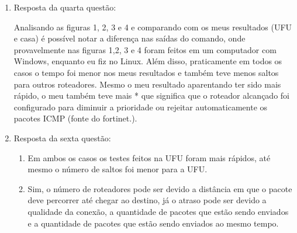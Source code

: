 \documentclass[12pt,a4paper]{report}
\begin{document}
\begin{enumerate}
\begin{enumerate}[label=(\alph*)]
		\end{enumerate}
		
		\item Resposta da quarta questão:

Analisando as figuras 1, 2, 3 e 4 e comparando com os meus resultados (UFU e casa) é possível notar a diferença nas saídas do comando, onde provavelmente nas figuras 1,2, 3 e 4 foram feitos em um computador com Windows, enquanto eu fiz no Linux. Além disso, praticamente em todos os casos o tempo foi menor nos meus resultados e também teve menos saltos para outros roteadores. Mesmo o meu resultado aparentando ter sido mais rápido, o meu também teve mais * que significa que o roteador alcançado foi configurado para diminuir a prioridade ou rejeitar automaticamente os pacotes ICMP (fonte do fortinet.).		

		\newpage
		\item Resposta da sexta questão:
		\begin{enumerate}[label=(\alph*)]
		\item Em ambos os casos os testes feitos na UFU foram mais rápidos, até mesmo o número de saltos foi menor para a UFU.
	
		\item Sim, o número de roteadores pode ser devido a distância em que o pacote deve percorrer até chegar ao destino, já o atraso pode ser devido a qualidade da conexão, a quantidade de pacotes que estão sendo enviados e a quantidade de pacotes que estão sendo enviados ao mesmo tempo.
		\end{enumerate}
	\end{enumerate}
\end{document}
